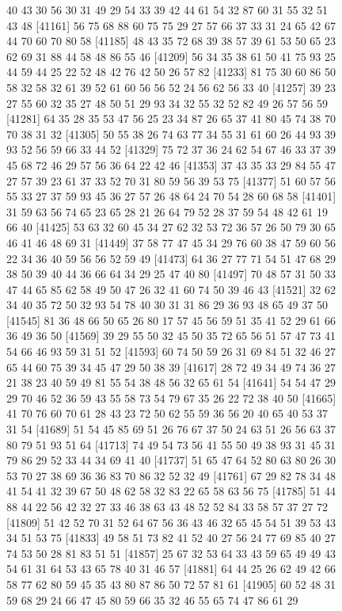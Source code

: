 \documentclass{article}
\begin{document}
\begin{figure}[H]
\begin{Schunk}
\begin{Soutput}
[41137] 40 43 30 56 30 31 49 29 54 33 39 42 44 61 54 32 87 60 31 55 32 51 43 48
[41161] 56 75 68 88 60 75 75 29 27 57 66 37 33 31 24 65 42 67 44 70 60 70 80 58
[41185] 48 43 35 72 68 39 38 57 39 61 53 50 65 23 62 69 31 88 44 58 48 86 55 46
[41209] 56 34 35 38 61 50 41 75 93 25 44 59 44 25 22 52 48 42 76 42 50 26 57 82
[41233] 81 75 30 60 86 50 58 32 58 32 61 39 52 61 60 56 56 52 24 56 62 56 33 40
[41257] 39 23 27 55 60 32 35 27 48 50 51 29 93 34 32 55 32 52 82 49 26 57 56 59
[41281] 64 35 28 35 53 47 56 25 23 34 87 26 65 37 41 80 45 74 38 70 70 38 31 32
[41305] 50 55 38 26 74 63 77 34 55 31 61 60 26 44 93 39 93 52 56 59 66 33 44 52
[41329] 75 72 37 36 24 62 54 67 46 33 37 39 45 68 72 46 29 57 56 36 64 22 42 46
[41353] 37 43 35 33 29 84 55 47 27 57 39 23 61 37 33 52 70 31 80 59 56 39 53 75
[41377] 51 60 57 56 55 33 27 37 59 93 45 36 27 57 26 48 64 24 70 54 28 60 68 58
[41401] 31 59 63 56 74 65 23 65 28 21 26 64 79 52 28 37 59 54 48 42 61 19 66 40
[41425] 53 63 32 60 45 34 27 62 32 53 72 36 57 26 50 79 30 65 46 41 46 48 69 31
[41449] 37 58 77 47 45 34 29 76 60 38 47 59 60 56 22 34 36 40 59 56 56 52 59 49
[41473] 64 36 27 77 71 54 51 47 68 29 38 50 39 40 44 36 66 64 34 29 25 47 40 80
[41497] 70 48 57 31 50 33 47 44 65 85 62 58 49 50 47 26 32 41 60 74 50 39 46 43
[41521] 32 62 34 40 35 72 50 32 93 54 78 40 30 31 31 86 29 36 93 48 65 49 37 50
[41545] 81 36 48 66 50 65 26 80 17 57 45 56 59 51 35 41 52 29 61 66 36 49 36 50
[41569] 39 29 55 50 32 45 50 35 72 65 56 51 57 47 73 41 54 66 46 93 59 31 51 52
[41593] 60 74 50 59 26 31 69 84 51 32 46 27 65 44 60 75 39 34 45 47 29 50 38 39
[41617] 28 72 49 34 49 74 36 27 21 38 23 40 59 49 81 55 54 38 48 56 32 65 61 54
[41641] 54 54 47 29 29 70 46 52 36 59 43 55 58 73 54 79 67 35 26 22 72 38 40 50
[41665] 41 70 76 60 70 61 28 43 23 72 50 62 55 59 36 56 20 40 65 40 53 37 31 54
[41689] 51 54 45 85 69 51 26 76 67 37 50 24 63 51 26 56 63 37 80 79 51 93 51 64
[41713] 74 49 54 73 56 41 55 50 49 38 93 31 45 31 79 86 29 52 33 44 34 69 41 40
[41737] 51 65 47 64 52 80 63 80 26 30 53 70 27 38 69 36 36 83 70 86 32 52 32 49
[41761] 67 29 82 78 34 48 41 54 41 32 39 67 50 48 62 58 32 83 22 65 58 63 56 75
[41785] 51 44 88 44 22 56 42 32 27 33 46 38 63 43 48 52 52 84 33 58 57 37 27 72
[41809] 51 42 52 70 31 52 64 67 56 36 43 46 32 65 45 54 51 39 53 43 34 51 53 75
[41833] 49 58 51 73 82 41 52 40 27 56 24 77 69 85 40 27 74 53 50 28 81 83 51 51
[41857] 25 67 32 53 64 33 43 59 65 49 49 43 54 61 31 64 53 43 65 78 40 31 46 57
[41881] 64 44 25 26 62 49 42 66 58 77 62 80 59 45 35 43 80 87 86 50 72 57 81 61
[41905] 60 52 48 31 59 68 29 24 66 47 45 80 59 66 35 32 46 55 65 74 47 86 61 29

\end{Soutput}
\end{Schunk}
\end{figure}
\end{document}
